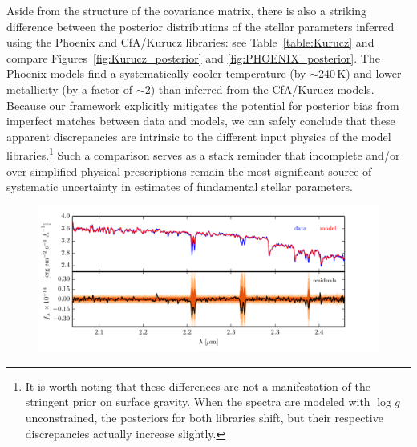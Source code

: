 \documentclass[iop,floatfix,twocolappendix]{emulateapj}
\begin{document}
Aside from the structure of the covariance matrix, there is also a striking difference between the 
posterior distributions of the stellar parameters inferred using the {\sc Phoenix} and {\sc 
CfA/Kurucz} libraries: see Table~\ref{table:Kurucz} and compare Figures~\ref{fig:Kurucz_posterior} 
and \ref{fig:PHOENIX_posterior}.  The {\sc Phoenix} models find a systematically cooler temperature 
(by $\sim$240\,K) and lower metallicity (by a factor of $\sim$2) than inferred from the {\sc 
CfA/Kurucz} models.  Because our framework explicitly mitigates the potential for posterior bias 
from imperfect matches between data and models, we can safely conclude that these apparent 
discrepancies are intrinsic to the different input physics of the model libraries.\footnote{It is 
worth noting that these differences are not a manifestation of the stringent prior on surface 
gravity.  When the spectra are modeled with $\log g$ unconstrained, the posteriors for both 
libraries shift, but their respective discrepancies actually increase slightly.}  Such a comparison 
serves as a stark reminder that incomplete and/or over-simplified physical prescriptions remain the 
most significant source of systematic uncertainty in estimates of fundamental stellar parameters.


\begin{figure}[!htb]
  \includegraphics{figs/residuals_Gl51_logg.pdf}
\vspace{-0.3cm}
\vspace{0.2cm}
\end{figure}
\end{document}
